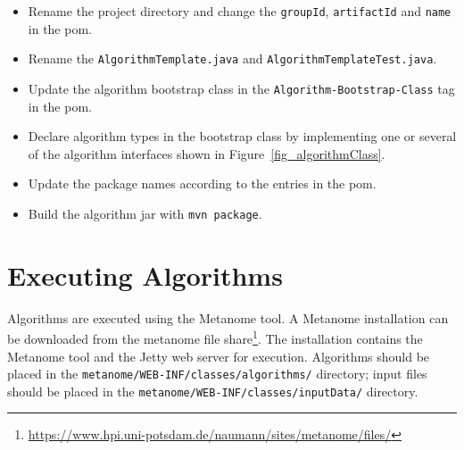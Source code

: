 \documentclass[10pt,a4paper]{article}
\begin{document}
\begin{itemize}
\item Rename the project directory and change the \texttt{groupId}, \texttt{artifactId} and \texttt{name} in the pom.
\item Rename the \texttt{AlgorithmTemplate.java} and \texttt{AlgorithmTemplateTest.java}.
\item Update the algorithm bootstrap class in the \texttt{Algorithm-Bootstrap-Class} tag in the pom.
\item Declare algorithm types in the bootstrap class by implementing one or several of the algorithm interfaces shown in Figure~\ref{fig_algorithmClass}. 
\item Update the package names according to the entries in the pom.
\item Build the algorithm jar with \texttt{mvn package}.
\end{itemize}

\section{Executing Algorithms}
\label{sec_executingAlgortithms}

Algorithms are executed using the Metanome tool. A Metanome installation can be downloaded from the metanome file share\footnote{\url{https://www.hpi.uni-potsdam.de/naumann/sites/metanome/files/}}. The installation contains the Metanome tool and the Jetty web server for execution. Algorithms should be placed in the \texttt{metanome/WEB-INF/classes/algorithms/} directory; input files should be placed in the \texttt{metanome/WEB-INF/classes/inputData/} directory.
\end{document}
